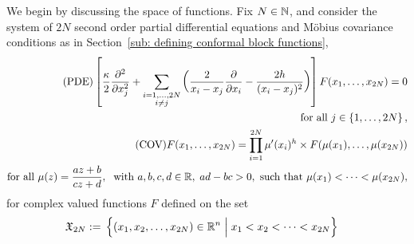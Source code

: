 \documentclass[oneside,english]{amsart}
\numberwithin{equation}{section}
\numberwithin{figure}{section}
\theoremstyle{plain}
\theoremstyle{plain}
\theoremstyle{plain}
\theoremstyle{remark}
\theoremstyle{plain}
\theoremstyle{plain}
\theoremstyle{plain}
\theoremstyle{plain}
\theoremstyle{plain}
\theoremstyle{plain}
\theoremstyle{plain}
\theoremstyle{plain}
\begin{document}
We begin by discussing the space of functions.
Fix $N \in \mathbb{N}$, and consider the system of $2N$ second order partial differential
equations %
and M\"obius covariance conditions %
as in Section~\ref{sub: defining conformal block functions},
\begin{align}
\label{eq: PDE for F} \tag{PDE} 
\left[ \frac{\kappa}{2} \frac{\partial^{2}}{\partial x_j^{2}}
    + \sum_{\substack{i=1,\ldots,2N \\ i\neq j}} \left( \frac{2}{x_i-x_j} \frac{\partial}{\partial x_i} - \frac{2 h}{(x_i-x_j)^2} \right) \right] F (x_1 , \ldots, x_{2N}) = 0 & \\
\nonumber
\text{for all } j \in \left\{ 1,\ldots,2N\right\} , & \\
\label{eq: COV for F} \tag{COV} 
F (x_1 , \ldots, x_{2N}) = 
    \prod_{i=1}^{2 N} \mu'(x_i)^{h} \times F (\mu(x_1) , \ldots, \mu(x_{2N})) & \\
\nonumber
\text{for all } \mu(z) = \frac{a z + b}{c z + d}, \; \text{ with } a,b,c,d \in \mathbb{R}, \; ad-bc > 0, 
    \text{ such that } \mu(x_1) < \cdots < \mu(x_{2N}) , &
\end{align}
for complex valued functions $F$ defined on the set
\begin{align*}
\mathfrak{X}_{2N} := \; & \left\{  (x_1, x_2, \ldots, x_{2N}) \in  \mathbb{R}^n \; \Big| \; x_1 < x_2 < \cdots < x_{2N} \right\}
\end{align*}
\end{document}
